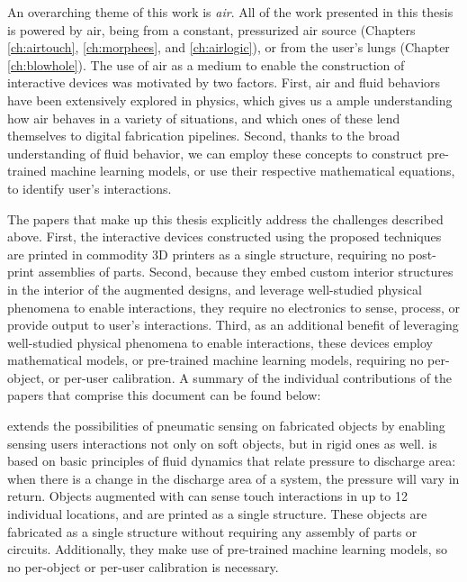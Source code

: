         An overarching theme of this work is \emph{air}. All of the work
        presented in this thesis is powered by air, being from a constant,
        pressurized air source (Chapters \ref{ch:airtouch}, \ref{ch:morphees},
        and \ref{ch:airlogic}), or from the user's lungs (Chapter
        \ref{ch:blowhole}). The use of air as a medium to enable the
        construction of interactive devices was motivated by two factors. First,
        air and fluid behaviors have been extensively explored in physics, which
        gives us a ample understanding how air behaves in a variety of
        situations, and which ones of these lend themselves to digital
        fabrication pipelines. Second, thanks to the broad understanding of
        fluid behavior, we can employ these concepts to construct pre-trained
        machine learning models, or use their respective mathematical equations,
        to identify user's interactions. 
        
        The papers that make up this thesis explicitly address the challenges
        described above. First, the interactive devices constructed using the
        proposed techniques are printed in commodity 3D printers as a single
        structure, requiring no post-print assemblies of parts. Second, because
        they embed custom interior structures in the interior of the augmented
        designs, and leverage well-studied physical phenomena to enable
        interactions, they require no electronics to sense, process, or provide
        output to user's interactions. Third, as an additional benefit of
        leveraging well-studied physical phenomena to enable interactions, these
        devices employ mathematical models, or pre-trained machine learning
        models, requiring no per-object, or per-user calibration. A summary of
        the individual contributions of the papers that comprise this document
        can be found below:

        \textsc{\at} extends the possibilities of pneumatic sensing on
        fabricated objects by enabling sensing users interactions not only on
        soft objects, but in rigid ones as well. \emph{\at} is based on basic
        principles of fluid dynamics that relate pressure to discharge area:
        when there is a change in the discharge area of a system, the pressure
        will vary in return. Objects augmented with \emph{\at} can sense touch
        interactions in up to 12 individual locations, and are printed as a
        single structure. These objects are fabricated as a single structure
        without requiring any assembly of parts or circuits. Additionally, they
        make use of pre-trained machine learning models, so no per-object or
        per-user calibration is necessary.
        
